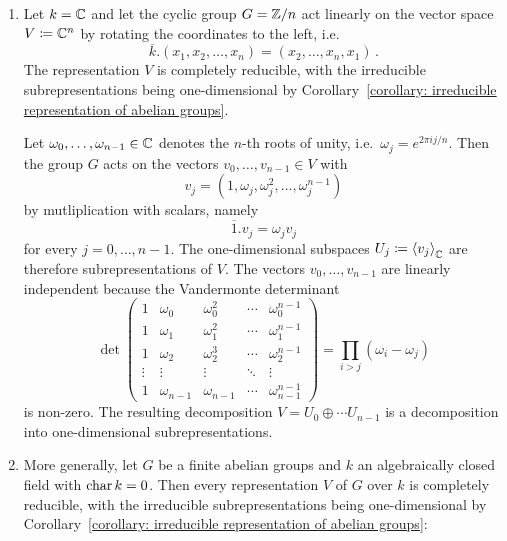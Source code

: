 \begin{example}
  \label{example: complex representations of finite abelian groups are completely reducible}
  \begin{enumerate}
    \item
      Let $k = \mathbb{C}$ and let the cyclic group $G = \mathbb{Z}/n$ act linearly on the vector space $V \coloneqq \mathbb{C}^n$ by rotating the coordinates to the left, i.e.
      \[
          \overline{k}.(x_1, x_2, \dotsc, x_n)
        = (x_2, \dotsc, x_n, x_1) \,.
      \]
      The representation $V$ is completely reducible, with the irreducible subrepresentations being one-dimensional by Corollary~\ref{corollary: irreducible representation of abelian groups}.
      
      Let $\omega_0, \dotsc, \omega_{n-1} \in \mathbb{C}$ denotes the $n$-th roots of unity, i.e.\ $\omega_j = e^{2 \pi i j/n}$.
      Then the group $G$ acts on the vectors $v_0, \dotsc, v_{n-1} \in V$ with
      \[
          v_j
        = (1, \omega_j, \omega_j^2, \dotsc, \omega_j^{n-1})
      \]
      by mutliplication with scalars, namely
      \[
          \overline{1}.v_j
        = \omega_j v_j
      \]
      for every $j = 0, \dotsc, n-1$.
      The one-dimensional subspaces $U_j \coloneqq \left\langle  v_j  \right\rangle_{\mathbb{C}}$ are therefore subrepresentations of $V$.
      The vectors $v_0, \dotsc, v_{n-1}$ are linearly independent because the Vandermonte determinant
      \[
          \det
          \begin{pmatrix}
            1       & \omega_0      & \omega_0^2    & \cdots  & \omega_0^{n-1}      \\
            1       & \omega_1      & \omega_1^2    & \cdots  & \omega_1^{n-1}      \\
            1       & \omega_2      & \omega_2^3    & \cdots  & \omega_2^{n-1}      \\
            \vdots  & \vdots        & \vdots        & \ddots  & \vdots              \\
            1       & \omega_{n-1}  & \omega_{n-1}  & \cdots  & \omega_{n-1}^{n-1}
          \end{pmatrix}
        = \prod_{i > j} (\omega_i - \omega_j)
      \]
      is non-zero.
      The resulting decomposition $V = U_0 \oplus \dotsb U_{n-1}$ is a decomposition into one-dimensional subrepresentations.
    \item
      More generally, let $G$ be a finite abelian groups and $k$ an algebraically closed field with $\operatorname{char} k = 0$.
      Then every representation $V$ of $G$ over $k$ is completely reducible, with the irreducible subrepresentations being one-dimensional by Corollary~\ref{corollary: irreducible representation of abelian groups}:
    

\end{enumerate}
\end{example}
